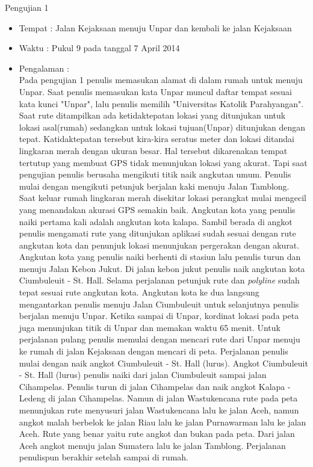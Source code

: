 	Pengujian 1
		\begin{itemize}
			\item Tempat : Jalan Kejaksaan menuju Unpar dan kembali ke jalan Kejaksaan
			\item Waktu : Pukul 9 pada tanggal 7 April 2014 
			\item Pengalaman : \\
			\hspace{0.5cm} Pada pengujian 1 penulis memasukan alamat di dalam rumah untuk menuju Unpar. Saat penulis memasukan kata Unpar muncul daftar tempat sesuai kata kunci "Unpar", lalu penulis memilih "Universitas Katolik Parahyangan". Saat rute ditampilkan ada ketidaktepatan lokasi yang ditunjukan untuk lokasi asal(rumah) sedangkan untuk lokasi tujuan(Unpar) ditunjukan dengan tepat. Katidaktepatan tersebut kira-kira seratus meter dan lokasi ditandai lingkaran merah dengan ukuran besar. Hal tersebut dikarenakan tempat tertutup yang membuat GPS tidak menunjukan lokasi yang akurat. Tapi saat pengujian penulis berusaha mengikuti titik naik angkutan umum.
			\hspace{0.5cm}Penulis mulai dengan mengikuti petunjuk berjalan kaki menuju Jalan Tamblong. Saat keluar rumah lingkaran merah disekitar lokasi perangkat mulai mengecil yang menandakan akurasi GPS semakin baik. Angkutan kota yang penulis naiki pertama kali adalah angkutan kota kalapa. Sambil berada di angkot penulis mengamati rute yang ditunjukan aplikasi sudah sesuai dengan rute angkutan kota dan penunjuk lokasi menunjukan pergerakan dengan akurat. Angkutan kota yang penulis naiki berhenti di stasiun lalu penulis turun dan menuju Jalan Kebon Jukut. Di jalan kebon jukut penulis naik angkutan kota Ciumbuleuit - St. Hall. Selama perjalanan petunjuk rute dan \textit{polyline} sudah tepat sesuai rute angkutan kota. Angkutan kota ke dua langsung mengantarkan penulis menuju Jalan Ciumbuleuit untuk selanjutnya penulis berjalan menuju Unpar. Ketika sampai di Unpar, kordinat lokasi pada peta juga menunjukan titik di Unpar dan memakan waktu 65 menit.
			\hspace{0.5cm}Untuk perjalanan pulang penulis memulai dengan mencari rute dari Unpar menuju ke rumah di jalan Kejaksaan dengan mencari di peta. Perjalanan penulis mulai dengan naik angkot Ciumbuleuit - St. Hall (lurus). Angkot Ciumbuleuit - St. Hall (lurus) penulis naiki dari jalan Ciumbuleuit sampai jalan Cihampelas. Penulis turun di jalan Cihampelas dan naik angkot Kalapa - Ledeng di jalan Cihampelas. Namun di jalan Wastukencana rute pada peta menunjukan rute menyusuri jalan Wastukencana lalu ke jalan Aceh, namun angkot malah berbelok ke jalan Riau lalu ke jalan Purnawarman lalu ke jalan Aceh. Rute yang benar yaitu rute angkot dan bukan pada peta. Dari jalan Aceh angkot menuju jalan Sumatera lalu ke jalan Tamblong. Perjalanan penulispun berakhir setelah sampai di rumah.
		\end{itemize}


